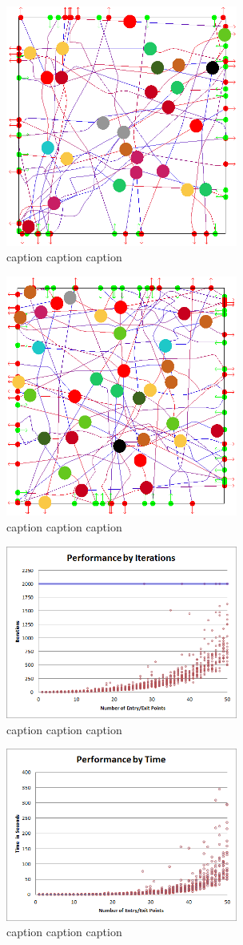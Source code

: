 \begin{figure}[H]
 \centering
 \includegraphics[width=3in]{images/res-30-entry-exit.png}
 \caption{caption caption caption}
\end{figure}

\begin{figure}[H]
 \centering
 \includegraphics[width=3in]{images/res-40-entry-exit.png}
 \caption{caption caption caption}
\end{figure}



\begin{figure}[H]
 \centering
 \includegraphics[width=3in]{images/res-iter-graph.png}
 \caption{caption caption caption}
\end{figure}

\begin{figure}[H]
 \centering
 \includegraphics[width=3in]{images/res-time-graph.png}
 \caption{caption caption caption}
\end{figure}
